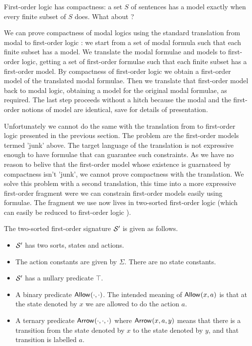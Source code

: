 \NI First-order logic has compactness: a set $S$ of sentences has a
model exactly when every finite subset of $S$ does. What about
\cathoristic{}?

We can prove compactness of modal logics using the standard
translation from modal to first-order logic \cite{BlackburnP:modlog}:
we start from a set of modal formula such that each finite subset has
a model. We translate the modal formulae and models to first-order
logic, getting a set of first-order formulae such that each finite
subset has a first-order model. By compactness of first-order logic we
obtain a first-order model of the translated modal formulae. Then we
translate that first-order model back to modal logic, obtaining a
model for the original modal formulae, as required. The last step
proceeds without a hitch because the modal and the first-order notions
of model are identical, save for details of presentation.

Unfortunately we cannot do the same with the translation from
\cathoristic{} to first-order logic presented in the previous
section. The problem are the first-order models termed 'junk' above.
The target language of the translation is not expressive enough to
have formulae that can guarantee such constraints.  As we have no
reason to belive that the first-order model whose existence is
guarnateed by compactness isn't 'junk', we cannot prove compactness
with the translation.  We solve this problem with a second translation, this time
into a more expressive first-order fragment were we can constrain
first-order models easily using formulae. The fragment we use now
lives in two-sorted first-order logic (which can easily be reduced to
first-order logic \cite{EndertonHB:matinttl}).

\begin{definition}
The two-sorted first-order signature $\mathcal{S}'$ is given as follows.
\begin{itemize}

\item $\mathcal{S}'$ has two sorts, states and actions. 

\item The action constants are given by $\Sigma$. There
are no state constants. 

\item $\mathcal{S}'$ has a nullary predicate $\top$.

\item A binary predicate $\mathsf{Allow}^{}(\cdot, \cdot)$. The intended
  meaning of $\mathsf{Allow}^{}(x, a)$ is that at the state denoted by $x$ we
  are allowed to do the action $a$.

\item A ternary predicate $\mathsf{Arrow}^{}(\cdot, \cdot, \cdot)$ where
  $\mathsf{Arrow}^{}(x, a, y)$ means that there is a transition from the
  state denoted by $x$ to the state denoted by $y$, and that
  transition is labelled $a$.

\end{itemize}
\end{definition}

